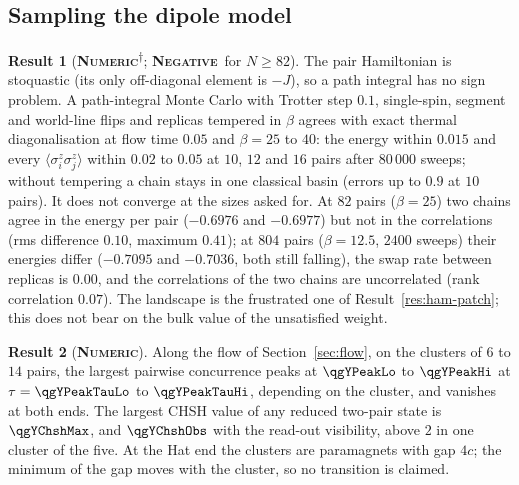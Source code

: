 \documentclass[11pt]{article}
\newcommand{\numeric}{\textbf{\textsc{Numeric}}}
\newcommand{\negres}{\textbf{\textsc{Negative}}}
\newcommand{\snap}{\textsuperscript{$\dagger$}}      %
\theoremstyle{definition}
\newtheorem{result}{Result}
\begin{document}
\subsection{Sampling the dipole model}
\begin{result}[\numeric\snap; \negres\ for $N\ge82$]\label{res:qmc}
The pair Hamiltonian is stoquastic (its only off-diagonal element is $-J$), so a path integral has no sign problem. A path-integral Monte Carlo with Trotter step $0.1$, single-spin, segment and world-line flips and replicas tempered in $\beta$ agrees with exact thermal diagonalisation at flow time $0.05$ and $\beta=25$ to $40$: the energy within $0.015$ and every $\langle\sigma^z_i\sigma^z_j\rangle$ within $0.02$ to $0.05$ at $10$, $12$ and $16$ pairs after $80\,000$ sweeps; without tempering a chain stays in one classical basin (errors up to $0.9$ at $10$ pairs). It does not converge at the sizes asked for. At $82$ pairs ($\beta=25$) two chains agree in the energy per pair ($-0.6976$ and $-0.6977$) but not in the correlations (rms difference $0.10$, maximum $0.41$); at $804$ pairs ($\beta=12.5$, $2400$ sweeps) their energies differ ($-0.7095$ and $-0.7036$, both still falling), the swap rate between replicas is $0.00$, and the correlations of the two chains are uncorrelated (rank correlation $0.07$). The landscape is the frustrated one of Result~\ref{res:ham-patch}; this does not bear on the bulk value of the unsatisfied weight.
\end{result}
\begin{result}[\numeric]\label{res:ham-flow}
Along the flow of Section~\ref{sec:flow}, on the clusters of $6$ to $14$ pairs, the largest pairwise concurrence peaks at $\qgYPeakLo$ to $\qgYPeakHi$ at $\tau=\qgYPeakTauLo$ to $\qgYPeakTauHi$, depending on the cluster, and vanishes at both ends. The largest CHSH value of any reduced two-pair state is $\qgYChshMax$, and $\qgYChshObs$ with the read-out visibility, above $2$ in one cluster of the five. At the Hat end the clusters are paramagnets with gap $4c$; the minimum of the gap moves with the cluster, so no transition is claimed.
\end{result}
\end{document}
